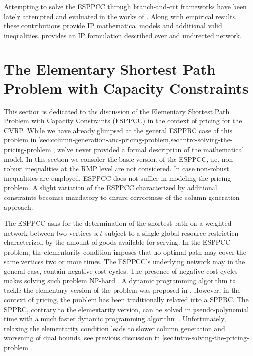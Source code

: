 Attempting to solve the ESPPCC through branch-and-cut frameworks
have been lately attempted and evaluated in the works of \textcite{jepsen2008branchandcut}.
Along with empirical results,
these contributions provide IP mathematical models and additional valid inequalities.
\textcite{jepsen2008branchandcut} provides an IP formulation described over and undirected network.

\section{The Elementary Shortest Path Problem with Capacity Constraints}
\label{sec:the-elementary-shortest-path-problem-with-resource-constraints}

This section is dedicated to the discussion of the
Elementary Shortest Path Problem with Capacity Constraints (ESPPCC)
in the context of pricing for the CVRP.
While we have already glimpsed at the general ESPPRC case of this problem in
\cref{sec:column-generation-and-pricing-problem,sec:intro-solving-the-pricing-problem},
we've never provided a formal description of the mathematical model.
In this section we consider the basic version of the ESPPCC,
i.e. non-robust inequalities at the RMP level are not considered.
In case non-robust inequalities are employed,
ESPPCC does not suffice in modeling the pricing problem.
A slight variation of the ESPPCC characterized by additional constraints
becomes mandatory to ensure correctness of the column generation approach.

The ESPPCC asks for the determination of the shortest path on a weighted network
between two vertices $s, t$
subject to a single global resource restriction characterized
by the amount of goods available for serving.
In the ESPPCC problem,
the elementarity condition imposes that no optimal path may
cover the same vertices two or more times.
The ESPPCC's underlying network may in the general case,
contain negative cost cycles.
The presence of negative cost cycles makes solving such problem NP-hard \parencite{dror1994}.
A dynamic programming algorithm
to tackle the elementary version of the problem
was proposed in \textcite{feillet2004}.
However, in the context of pricing, the problem has been traditionally relaxed into a SPPRC.
The SPPRC,
contrary to the elementarity version,
can be solved in pseudo-polynomial time with a much faster dynamic programming algorithm \parencite{desrochers1992}.
Unfortunately,
relaxing the elementarity condition leads to slower column generation and worsening of dual bounds,
see previous discussion in \cref{sec:intro-solving-the-pricing-problem}.

